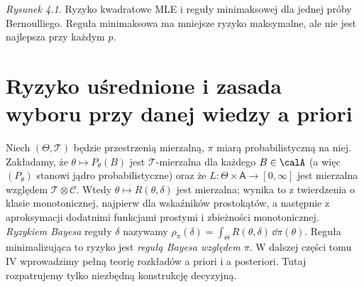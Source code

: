 \begin{center}
\end{center}
\noindent\emph{Rysunek 4.1.} Ryzyko kwadratowe MLE i reguły
minimaksowej dla jednej próby Bernoulliego. Reguła minimaksowa ma
mniejsze ryzyko maksymalne, ale nie jest najlepsza przy każdym $p$.


\section{Ryzyko uśrednione i zasada wyboru przy danej wiedzy a priori}
\begin{definicja}\label{def:bayes-risk}
Niech $(\Theta,\mathcal T)$ będzie przestrzenią mierzalną,
$\pi$ miarą probabilistyczną na niej. Zakładamy, że
$\theta\mapsto P_\theta(B)$ jest $\mathcal T$-mierzalna dla
każdego $B\in\calA$ (a więc $(P_\theta)$ stanowi jądro
probabilistyczne) oraz że $L:\Theta\times\mathsf A\to[0,\infty]$
jest mierzalna względem $\mathcal T\otimes\mathcal C$.
Wtedy $\theta\mapsto R(\theta,\delta)$ jest mierzalna;
wynika to z twierdzenia o klasie monotonicznej, najpierw dla
wskaźników prostokątów, a następnie z aproksymacji dodatnimi
funkcjami prostymi i zbieżności monotonicznej.
\emph{Ryzykiem Bayesa} reguły $\delta$ nazywamy
$\rho_\pi(\delta)=\int_\Theta R(\theta,\delta)\,\dd\pi(\theta)$.
Reguła minimalizująca to ryzyko jest \emph{regułą Bayesa względem $\pi$}.
W dalszej części tomu IV wprowadzimy pełną teorię rozkładów
a priori i a posteriori. Tutaj rozpatrujemy tylko niezbędną
konstrukcję decyzyjną.
\end{definicja}

